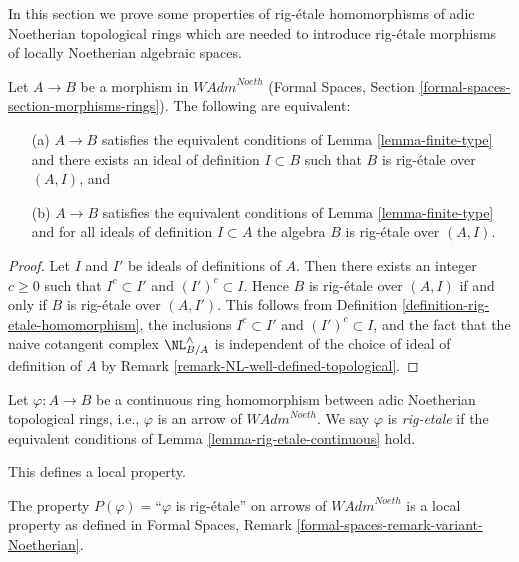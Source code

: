 \noindent
In this section we prove some properties of rig-\'etale homomorphisms
of adic Noetherian topological rings which are needed to introduce
rig-\'etale morphisms of locally Noetherian algebraic spaces.

\begin{lemma}
\label{lemma-rig-etale-continuous}
Let $A \to B$ be a morphism in $\textit{WAdm}^{Noeth}$
(Formal Spaces, Section \ref{formal-spaces-section-morphisms-rings}).
The following are equivalent:
\begin{enumerate}
\item[(a)] $A \to B$ satisfies the equivalent conditions of
Lemma \ref{lemma-finite-type} and there exists an ideal of definition
$I \subset B$ such that $B$ is rig-\'etale over $(A, I)$, and
\item[(b)] $A \to B$ satisfies the equivalent conditions of
Lemma \ref{lemma-finite-type} and for all ideals of definition
$I \subset A$ the algebra $B$ is rig-\'etale over $(A, I)$.
\end{enumerate}
\end{lemma}

\begin{proof}
Let $I$ and $I'$ be ideals of definitions of $A$. Then there exists an
integer $c \geq 0$ such that $I^c \subset I'$ and $(I')^c \subset I$. Hence
$B$ is rig-\'etale over $(A, I)$ if and only if
$B$ is rig-\'etale over $(A, I')$. This follows from
Definition \ref{definition-rig-etale-homomorphism},
the inclusions $I^c \subset I'$ and $(I')^c \subset I$, and
the fact that the naive cotangent complex $\NL_{B/A}^\wedge$
is independent of the choice of ideal of definition of $A$ by
Remark \ref{remark-NL-well-defined-topological}.
\end{proof}

\begin{definition}
\label{definition-rig-etale-continuous-homomorphism}
Let $\varphi : A \to B$ be a continuous ring homomorphism
between adic Noetherian topological rings, i.e., $\varphi$
is an arrow of $\textit{WAdm}^{Noeth}$. We say
$\varphi$ is {\it rig-etale} if the equivalent conditions
of Lemma \ref{lemma-rig-etale-continuous} hold.
\end{definition}

\noindent
This defines a local property.

\begin{lemma}
\label{lemma-rig-etale-axioms}
The property $P(\varphi)=$``$\varphi$ is rig-\'etale'' on arrows
of $\textit{WAdm}^{Noeth}$ is a local property as defined in
Formal Spaces, Remark \ref{formal-spaces-remark-variant-Noetherian}.
\end{lemma}

